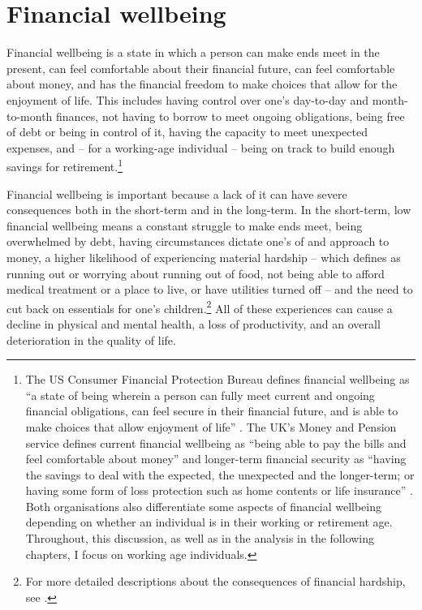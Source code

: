 
\section{Financial wellbeing}%

Financial wellbeing is a state in which a person can make ends meet in the
present, can feel comfortable about their financial future, can feel
comfortable about money, and has the financial freedom to make choices that
allow for the enjoyment of life. This includes having control over one's
day-to-day and month-to-month finances, not having to borrow to meet
ongoing obligations, being free of debt or being in control of it, having the
capacity to meet unexpected expenses, and -- for a working-age individual --
being on track to build enough savings for retirement.\footnote{The US Consumer
    Financial Protection Bureau defines financial wellbeing as ``a state of
    being wherein a person can fully meet current and ongoing financial
    obligations, can feel secure in their financial future, and is able to make
    choices that allow enjoyment of life'' \citep{cfpb2015financial}. The UK's
    Money and Pension service defines current financial wellbeing as ``being
    able to pay the bills and feel comfortable about money'' and longer-term
    financial security as ``having the savings to deal with the expected, the
    unexpected and the longer-term; or having some form of loss protection such
    as home contents or life insurance'' \citep{mps2018building}. Both
    organisations also differentiate some aspects of financial wellbeing
    depending on whether an individual is in their working or retirement age.
Throughout, this discussion, as well as in the analysis in the following
chapters, I focus on working age individuals.}

Financial wellbeing is important because a lack of it can have severe
consequences both in the short-term and in the long-term. In the short-term,
low financial wellbeing means a constant struggle to make ends meet, being
overwhelmed by debt, having circumstances dictate one's of and approach to
money, a higher likelihood of experiencing material hardship -- which
\citep{cfpb2017financial} defines as running out or worrying about running out
of food, not being able to afford medical treatment or a place to live, or have
utilities turned off -- and the need to cut back on essentials for one's
children.\footnote{For more detailed descriptions about the consequences of
    financial hardship, see \citet{cfpb2017financial, mps2018building,
stepchange2017strengthening}.} All of these experiences can cause a decline in
physical and mental health, a loss of productivity, and an overall
deterioration in the quality of life.

